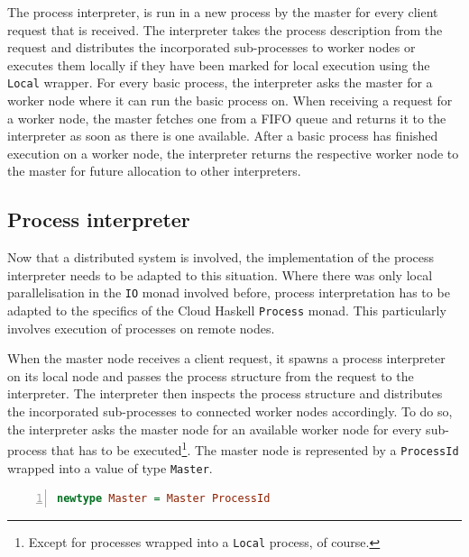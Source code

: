 The process interpreter, is run in a new process by the master for every client request that is received. The interpreter takes the process description from the request and distributes the incorporated sub-processes to worker nodes or executes them locally if they have been marked for local execution using the \texttt{Local} wrapper. For every basic process, the interpreter asks the master for a worker node where it can run the basic process on. When receiving a request for a worker node, the master fetches one from a FIFO queue and returns it to the interpreter as soon as there is one available. After a basic process has finished execution on a worker node, the interpreter returns the respective worker node to the master for future allocation to other interpreters. %


\subsection{Process interpreter}
\label{chp:interpreter}
Now that a distributed system is involved, the implementation of the process interpreter needs to be adapted to this situation. Where there was only local parallelisation in the \texttt{IO} monad involved before, process interpretation has to be adapted to the specifics of the \textsf{Cloud Haskell} \texttt{Process} monad. This particularly involves execution of processes on remote nodes.

When the master node receives a client request, it spawns a process interpreter on its local node and passes the process structure from the request to the interpreter. The interpreter then inspects the process structure and distributes the incorporated sub-processes to connected worker nodes accordingly. To do so, the interpreter asks the master node for an available worker node for every sub-process that has to be executed\footnote{Except for processes wrapped into a \texttt{Local} process, of course.}. The master node is represented by a \texttt{ProcessId} wrapped into a value of type \texttt{Master}.
\begin{lstlisting}[language=Haskell,caption=Data type for the address of a master node.,numbers=left,frame=bt]
newtype Master = Master ProcessId
\end{lstlisting}

